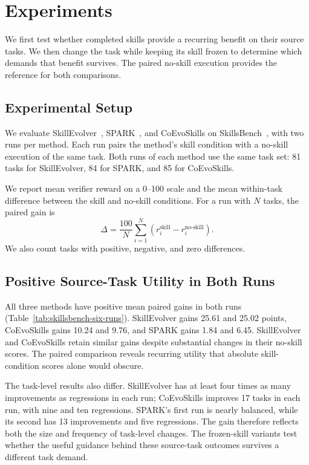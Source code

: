 \section{Experiments}
\label{sec:skillsbench-experiments}

We first test whether completed skills provide a recurring benefit on their source tasks. We then change the task while keeping its skill frozen to determine which demands that benefit survives. The paired no-skill execution provides the reference for both comparisons.

\subsection{Experimental Setup}

We evaluate SkillEvolver~\cite{zhang2026skillevolver}, SPARK~\cite{zhou2026spark}, and CoEvoSkills \cite{zhang2026coevoskills} on SkillsBench~\cite{li2026skillsbench}, with two runs per method. Each run pairs the method's skill condition with a no-skill execution of the same task. Both runs of each method use the same task set: 81 tasks for SkillEvolver, 84 for SPARK, and 85 for CoEvoSkills.

We report mean verifier reward on a 0--100 scale and the mean within-task difference between the skill and no-skill conditions. For a run with $N$ tasks, the paired gain is
\begin{equation}
\Delta = \frac{100}{N}\sum_{i=1}^{N}
\left(r_i^{\mathrm{skill}}-r_i^{\mathrm{no\text{-}skill}}\right).
\end{equation}
We also count tasks with positive, negative, and zero differences.

\subsection{Positive Source-Task Utility in Both Runs}

All three methods have positive mean paired gains in both runs (Table~\ref{tab:skillsbench-six-runs}). SkillEvolver gains 25.61 and 25.02 points, CoEvoSkills gains 10.24 and 9.76, and SPARK gains 1.84 and 6.45. SkillEvolver and CoEvoSkills retain similar gains despite substantial changes in their no-skill scores. The paired comparison reveals recurring utility that absolute skill-condition scores alone would obscure.

The task-level results also differ. SkillEvolver has at least four times as many improvements as regressions in each run; CoEvoSkills improves 17 tasks in each run, with nine and ten regressions. SPARK's first run is nearly balanced, while its second has 13 improvements and five regressions. The gain therefore reflects both the size and frequency of task-level changes. The frozen-skill variants test whether the useful guidance behind these source-task outcomes survives a different task demand.


